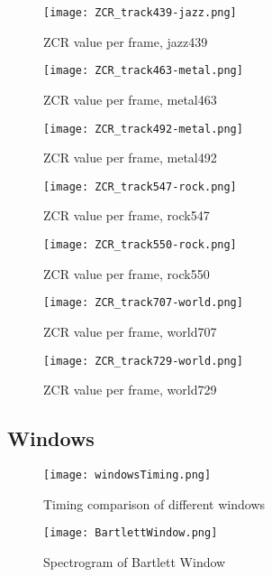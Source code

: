 \documentclass{article} %
\begin{document}
\begin{figure}
\centering
\texttt{[image: ZCR\_track439-jazz.png]}
\caption{ZCR value per frame, jazz439}
\label{fig:ZCR_439}
\end{figure}

\begin{figure}
\centering
\texttt{[image: ZCR\_track463-metal.png]}
\caption{ZCR value per frame, metal463}
\label{fig:ZCR_463}
\end{figure}


\begin{figure}
\centering
\texttt{[image: ZCR\_track492-metal.png]}
\caption{ZCR value per frame, metal492}
\label{fig:ZCR_492}
\end{figure}


\begin{figure}
\centering
\texttt{[image: ZCR\_track547-rock.png]}
\caption{ZCR value per frame, rock547}
\label{fig:ZCR_547}
\end{figure}


\begin{figure}
\centering
\texttt{[image: ZCR\_track550-rock.png]}
\caption{ZCR value per frame, rock550}
\label{fig:ZCR_550}
\end{figure}


\begin{figure}
\centering
\texttt{[image: ZCR\_track707-world.png]}
\caption{ZCR value per frame, world707}
\label{fig:ZCR_707}
\end{figure}


\begin{figure}[h!]
\centering
\texttt{[image: ZCR\_track729-world.png]}
\caption{ZCR value per frame, world729}
\label{fig:ZCR_729}
\end{figure}

\clearpage
\subsection{Windows}

\begin{figure}[ht!]
\centering
\texttt{[image: windowsTiming.png]}
\caption{Timing comparison of different windows}
\label{fig:windowsTimings}
\end{figure}


\begin{figure}[H]
\centering
\texttt{[image: BartlettWindow.png]}
\caption{Spectrogram of Bartlett Window}
\label{fig:bartWindows}
\end{figure}
\end{document}
